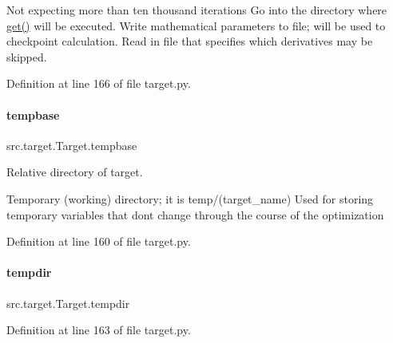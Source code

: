 Not expecting more than ten thousand iterations Go into the directory where \hyperlink{classsrc_1_1target_1_1RemoteTarget_ad5a26180c653152b879d4cb82798aa23}{get()} will be executed. Write mathematical parameters to file; will be used to checkpoint calculation. Read in file that specifies which derivatives may be skipped. 

Definition at line 166 of file target.\+py.

\mbox{\label{classsrc_1_1target_1_1Target_ae182b033fbe054ff2daa7659e69a7957}} 
\paragraph{\texorpdfstring{tempbase}{tempbase}}
{\footnotesize\ttfamily src.\+target.\+Target.\+tempbase\hspace{0.3cm}{\ttfamily [inherited]}}



Relative directory of target. 

Temporary (working) directory; it is temp/(target\+\_\+name) Used for storing temporary variables that don\textquotesingle{}t change through the course of the optimization 

Definition at line 160 of file target.\+py.

\mbox{\label{classsrc_1_1target_1_1Target_a7cc95b1ec34fa75172c81469ff6e5d1d}} 
\paragraph{\texorpdfstring{tempdir}{tempdir}}
{\footnotesize\ttfamily src.\+target.\+Target.\+tempdir\hspace{0.3cm}{\ttfamily [inherited]}}



Definition at line 163 of file target.\+py.

\mbox{\label{classsrc_1_1target_1_1RemoteTarget_a1cd6b1fe76d7d69a6d26fd305fce8920}} 
